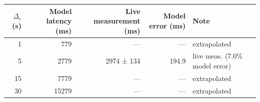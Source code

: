 \begin{tabular}{rrrrl}
\toprule
$\Delta_c$ (s) & Model latency (ms) & Live measurement (ms) & Model error (ms) & Note \\
\midrule
1 & 779 & — & — & extrapolated \\
5 & 2779 & 2974 ± 134 & 194.9 & live meas. (7.0\% model error) \\
15 & 7779 & — & — & extrapolated \\
30 & 15279 & — & — & extrapolated \\
\bottomrule
\end{tabular}